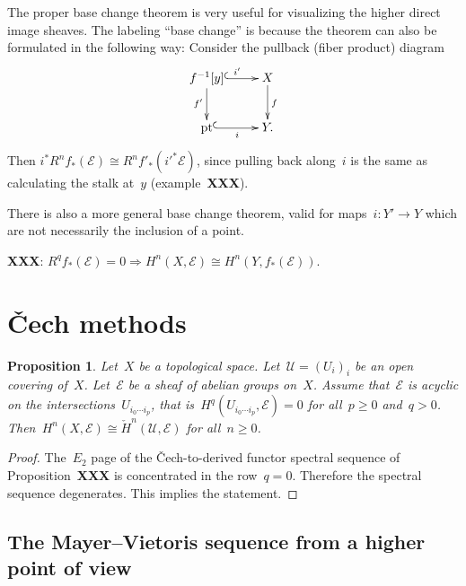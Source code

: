 \documentclass[10pt]{amsart}
\theoremstyle{definition}
\theoremstyle{plain}
\newtheorem{prop}[defn]{Proposition}
\theoremstyle{remark}
\newcommand{\E}{\mathcal{E}}
\newcommand{\U}{\mathcal{U}}
\newcommand{\pt}{\mathrm{pt}}
\begin{document}
The proper base change theorem is very useful for visualizing the higher direct
image sheaves. The labeling ``base change'' is because the theorem can also be
formulated in the following way: Consider the pullback (fiber product) diagram
\[ \xymatrix{
  f^{-1}[y] \ar@{^{(}->}[r]^{i'} \ar[d]_{f'} & X \ar[d]^f \\
  \pt \ar@{^{(}->}[r]_i & Y.
} \]
Then $i^* R^n f_*(\E) \cong R^n f'_*(i'^*\E)$, since pulling back along~$i$ is
the same as calculating the stalk at~$y$ (example~\textbf{XXX}).

There is also a more general base change theorem, valid for maps~$i : Y' \to Y$
which are not necessarily the inclusion of a point.

\textbf{XXX}: $R^q f_*(\E) = 0 \Rightarrow H^n(X,\E) \cong H^n(Y,f_*(\E))$.


\section{Čech methods}

\begin{prop}Let~$X$ be a topological space. Let~$\U = (U_i)_i$ be an open
covering of~$X$. Let~$\E$ be a sheaf of abelian groups
on~$X$. Assume that~$\E$ is acyclic on the intersections~$U_{i_0 \cdots i_p}$,
that is~$H^q(U_{i_0 \cdots i_p}, \E) = 0$ for all~$p \geq 0$ and~$q > 0$.
Then~$H^n(X,\E) \cong \check H^n(\U,\E)$ for all~$n \geq 0$.\end{prop}

\begin{proof}The~$E_2$ page of the Čech-to-derived functor spectral sequence of
Proposition~\textbf{XXX} is concentrated in the row~$q = 0$. Therefore the
spectral sequence degenerates. This implies the statement.
\end{proof}


\subsection{The Mayer--Vietoris sequence from a higher point of view}
\end{document}
